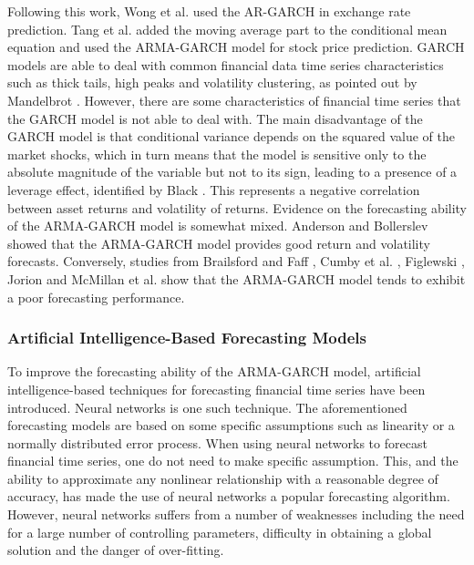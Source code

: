 Following this work, Wong et al. \cite{Wetal} used the AR-GARCH in exchange rate prediction. Tang et al. \cite{Tetal} added the moving average part to the conditional mean equation and used the ARMA-GARCH model for stock price prediction. GARCH models are able to deal with common financial data time series characteristics such as thick tails, high peaks and volatility clustering, as pointed out by Mandelbrot \cite{Mandelbrot}. However, there are some characteristics of financial time series that the GARCH model is not able to deal with. The main disadvantage of the GARCH model is that conditional variance depends on the squared value of the market shocks, which in turn means that the model is sensitive only to the absolute magnitude of the variable but not to its sign, leading to a presence of a leverage effect, identified by Black \cite{Black}. This represents a negative correlation between asset returns and volatility of returns. Evidence on the forecasting ability of the ARMA-GARCH model is somewhat mixed. Anderson and Bollerslev \cite{A&B} showed that the ARMA-GARCH model provides good return and volatility forecasts. Conversely, studies from Brailsford and Faff \cite{f1}, Cumby et al. \cite{f2}, Figlewski \cite{f3}, Jorion \cite{f4}\cite{f5} and McMillan et al. \cite{f6} show that the ARMA-GARCH model tends to exhibit a poor forecasting performance. 

\subsubsection{Artificial Intelligence-Based Forecasting Models}

To improve the forecasting ability of the ARMA-GARCH model, artificial intelligence-based techniques for forecasting financial time series have been introduced. Neural networks is one such technique. The aforementioned forecasting models are based on some specific assumptions such as linearity or a normally distributed error process. When using neural networks to forecast financial time series, one do not need to make specific assumption. This, and the ability to approximate any nonlinear relationship with a reasonable degree of accuracy, has made the use of neural networks a popular forecasting algorithm. However, neural networks suffers from a number of weaknesses including the need for a large number of controlling parameters, difficulty in obtaining a global solution and the danger of over-fitting.

